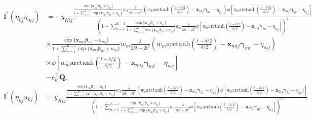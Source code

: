 \documentclass[12pt, %
               openright, %
               oneside, %
               a4paper, %
               chapter=TITLE, %
               section=TITLE, %
               brazil,
               english %
]{abntex2}
\begin{document}
\begin{apendicesenv}
\begin{align*}
 \bm{l}^{''}(\eta_{kj} \eta_{mj}) &= -
 y_{Kij}
 \frac{\frac{\exp\{\bm{x}_{kij} \bm{\beta}_{ki} + u_{kj}\}
            }{1 + \sum_{n = 1}^{K-1}
                  \exp\{\bm{x}_{nij} \bm{\beta}_{ni} + u_{nj}\}}
       w_{k}\frac{\delta}{2\delta t - 2t^{2}}
      (w_{k} \text{arctanh}\left(\frac{t-\delta/2}{\delta/2}\right)
       - \bm{x}_{kij}\bm{\gamma}_{ki} - \eta_{kj})
       \phi[w_{k} \text{arctanh}\left(\frac{t-\delta/2}{\delta/2}\right)
            - \bm{x}_{kij}\bm{\gamma}_{ki} - \eta_{kj}
           ]}{
 \left( 1 - \sum_{n = 1}^{K-1}
            \frac{\exp\{\bm{x}_{nij} \bm{\beta}_{ni} + u_{nj}\}
                 }{1 + \sum_{n = 1}^{K-1}
                       \exp\{\bm{x}_{nij} \bm{\beta}_{ni} + u_{nj}\}}
            w_{n}\frac{\delta}{2\delta t - 2t^{2}}
            \phi[w_{n}
            \text{arctanh}\left(\frac{t-\delta/2}{\delta/2}\right)
            - \bm{x}_{nij}\bm{\gamma}_{ni} - \eta_{nj}]
 \right)^{2}}\\
 &\times \frac{\exp\{\bm{x}_{mij} \bm{\beta}_{mi} + u_{mj}\}
              }{1 + \sum_{n = 1}^{K-1}
                    \exp\{\bm{x}_{nij} \bm{\beta}_{ni} + u_{nj}\}}
         w_{m}\frac{\delta}{2\delta t - 2t^{2}}
        (w_{m} \text{arctanh}\left(\frac{t-\delta/2}{\delta/2}\right)
         - \bm{x}_{mij}\bm{\gamma}_{mi} - \eta_{mj})\\
 &\times \phi[w_{m}
              \text{arctanh}\left(\frac{t-\delta/2}{\delta/2}\right)
              - \bm{x}_{mij}\bm{\gamma}_{mi} - \eta_{mj}
             ]\\
 &- e_{k}^{\top} \bm{Q},
\end{align*}
\begin{align*}
 \bm{l}^{''}(\eta_{kj} u_{kj}) &=
 y_{Kij}
 \frac{\frac{\exp\{\bm{x}_{kij} \bm{\beta}_{ki} + u_{kj}\}}{
             1 + \sum_{n = 1}^{K-1}
                 \exp\{\bm{x}_{nij} \bm{\beta}_{ni} + u_{nj}\}}
  w_{k}\frac{\delta}{2\delta t - 2t^{2}}
 (w_{k} \text{arctanh}\left(\frac{t-\delta/2}{\delta/2}\right)
  - \bm{x}_{kij}\bm{\gamma}_{ki} - \eta_{kj})
 \phi[w_{k} \text{arctanh}\left(\frac{t-\delta/2}{\delta/2}\right)
      - \bm{x}_{kij}\bm{\gamma}_{ki} - \eta_{kj})]}{
 \left( 1 - \sum_{n = 1}^{K-1}
            \frac{\exp\{\bm{x}_{nij} \bm{\beta}_{ni} + u_{nj}\}}{
                  1 + \sum_{n = 1}^{K-1}
                      \exp\{\bm{x}_{nij} \bm{\beta}_{ni} + u_{nj}\}}
            w_{n}\frac{\delta}{2\delta t - 2t^{2}}
        \phi[w_{n} \text{arctanh}\left(\frac{t-\delta/2}{\delta/2}\right)
             - \bm{x}_{nij}\bm{\gamma}_{ni} - \eta_{nj}]\right)^{2}}\\

\end{align*}
\end{apendicesenv}
\end{document}
